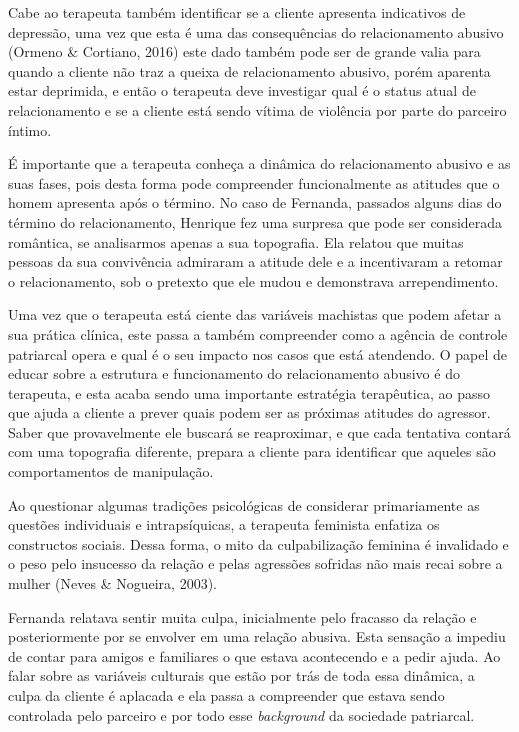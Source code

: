 Cabe ao terapeuta também identificar se a cliente apresenta indicativos de depressão, uma vez que esta é uma das consequências do relacionamento abusivo (Ormeno \& Cortiano, 2016) este dado também pode ser de grande valia para quando a cliente não traz a queixa de relacionamento abusivo, porém aparenta estar deprimida, e então o terapeuta deve investigar qual é o status atual de relacionamento e se a cliente está sendo vítima de violência por parte do parceiro íntimo.

É importante que a terapeuta conheça a dinâmica do relacionamento abusivo e as suas fases, pois desta forma pode compreender funcionalmente as atitudes que o homem apresenta após o término. No caso de Fernanda, passados alguns dias do término do relacionamento, Henrique fez uma surpresa que pode ser considerada romântica, se analisarmos apenas a sua topografia. Ela relatou que muitas pessoas da sua convivência admiraram a atitude dele e a incentivaram a retomar o relacionamento, sob o pretexto que ele mudou e demonstrava arrependimento.

Uma vez que o terapeuta está ciente das variáveis machistas que podem afetar a sua prática clínica, este passa a também compreender como a agência de controle patriarcal opera e qual é o seu impacto nos casos que está atendendo. O papel de educar sobre a estrutura e funcionamento do relacionamento abusivo é do terapeuta, e esta acaba sendo uma importante estratégia terapêutica, ao passo que ajuda a cliente a prever quais podem ser as próximas atitudes do agressor. Saber que provavelmente ele buscará se reaproximar, e que cada tentativa contará com uma topografia diferente, prepara a cliente para identificar que aqueles são comportamentos de manipulação.

Ao questionar algumas tradições psicológicas de considerar primariamente as questões individuais e intrapsíquicas, a terapeuta feminista enfatiza os constructos sociais. Dessa forma, o mito da culpabilização feminina é invalidado e o peso pelo insucesso da relação e pelas agressões sofridas não mais recai sobre a mulher (Neves \& Nogueira, 2003).

Fernanda relatava sentir muita culpa, inicialmente pelo fracasso da relação e posteriormente por se envolver em uma relação abusiva. Esta sensação a impediu de contar para amigos e familiares o que estava acontecendo e a pedir ajuda. Ao falar sobre as variáveis culturais que estão por trás de toda essa dinâmica, a culpa da cliente é aplacada e ela passa a compreender que estava sendo controlada pelo parceiro e por todo esse \textit{background} da sociedade patriarcal.

